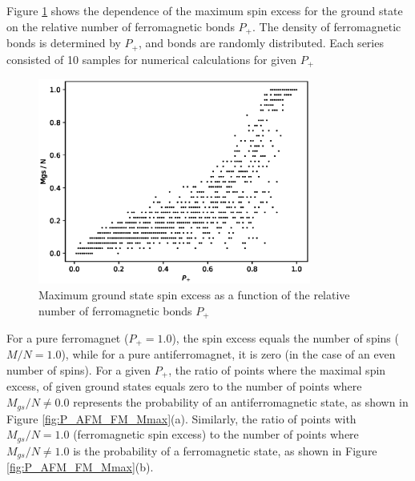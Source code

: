 \documentclass[preprint,12pt]{elsarticle}
\begin{document}
Figure \ref{fig:Mgs(P+)} shows the dependence of the maximum spin excess for the ground state on the relative number of ferromagnetic bonds $P_+$. The density of ferromagnetic bonds is determined by $P_+$, and bonds are randomly distributed. Each series consisted of 10 samples for numerical calculations for given $P_+$

\begin{figure}[H]
	\centering
	\includegraphics[width=0.8\textwidth]{images/Mgs(P+).eps}
	\caption{Maximum ground state spin excess as a function of the relative number of ferromagnetic bonds $P_+$}
	\label{fig:Mgs(P+)}
\end{figure}

For a pure ferromagnet ($P_+ = 1.0$), the spin excess equals the number of spins ($M/N = 1.0$), while for a pure antiferromagnet, it is zero (in the case of an even number of spins). For a given $P_+$, the ratio of points where the maximal spin excess, of given ground states equals zero to the number of points where $M_{gs}/N \neq 0.0$ represents the probability of an antiferromagnetic state, as shown in Figure \ref{fig:P_AFM_FM_Mmax}(a). Similarly, the ratio of points with $M_{gs}/N = 1.0$ (ferromagnetic spin excess) to the number of points where $M_{gs}/N \neq 1.0$ is the probability of a ferromagnetic state, as shown in Figure \ref{fig:P_AFM_FM_Mmax}(b).
\end{document}
